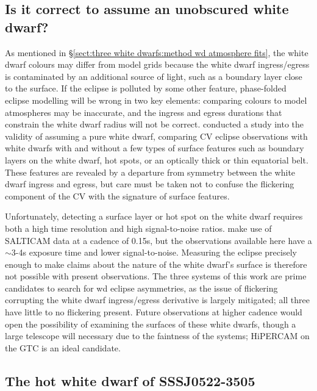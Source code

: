 \subsection{Is it correct to assume an unobscured white dwarf?}
\label{sect:impure white dwarf discussion}

As mentioned in \S\ref{sect:three white dwarfs:method wd atmosphere fits}, the white dwarf colours may differ from model grids because the white dwarf ingress/egress is contaminated by an additional source of light, such as a boundary layer close to the surface.
If the eclipse is polluted by some other feature, phase-folded eclipse modelling will be wrong in two key elements: comparing colours to model atmospheres may be inaccurate, and the ingress and egress durations that constrain the white dwarf radius will not be correct.
\citet{Spark2015} conducted a study into the validity of assuming a pure white dwarf, comparing CV eclipse observations with white dwarfs with and without a few types of surface features such as boundary layers on the white dwarf, hot spots, or an optically thick or thin equatorial belt.
These features are revealed by a departure from symmetry between the white dwarf ingress and egress, but care must be taken not to confuse the flickering component of the CV with the signature of surface features.

Unfortunately, detecting a surface layer or hot spot on the white dwarf requires both a high time resolution and high signal-to-noise ratios. \citet{Spark2015} make use of SALTICAM data at a cadence of 0.15s, but the observations available here have a $\sim$3-4s exposure time and lower signal-to-noise. Measuring the eclipse precisely enough to make claims about the nature of the white dwarf's surface is therefore not possible with present observations.
The three systems of this work are prime candidates to search for wd eclipse asymmetries, as the issue of flickering corrupting the white dwarf ingress/egress derivative is largely mitigated; all three have little to no flickering present.
Future observations at higher cadence would open the possibility of examining the surfaces of these white dwarfs, though a large telescope will necessary due to the faintness of the systems; HiPERCAM on the GTC is an ideal candidate.


\subsection{The hot white dwarf of SSSJ0522-3505}
\label{sect:SSSJ0522-3505 white dwarf temperature discussion}

